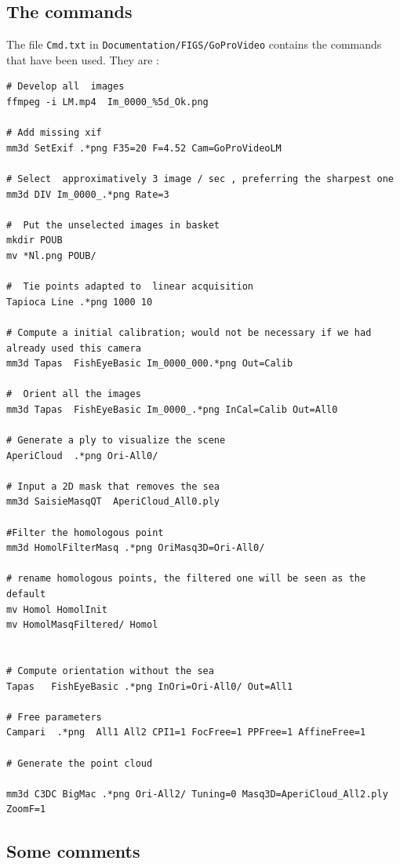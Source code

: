 \subsection{The commands}\label{GoProVideo:Commands}

The file {\tt Cmd.txt} in {\tt Documentation/FIGS/GoProVideo} contains the commands that have been used. They are :

\begin{verbatim}
# Develop all  images
ffmpeg -i LM.mp4  Im_0000_%5d_Ok.png

# Add missing xif
mm3d SetExif .*png F35=20 F=4.52 Cam=GoProVideoLM

# Select  approximatively 3 image / sec , preferring the sharpest one
mm3d DIV Im_0000_.*png Rate=3

#  Put the unselected images in basket
mkdir POUB
mv *Nl.png POUB/

#  Tie points adapted to  linear acquisition
Tapioca Line .*png 1000 10

# Compute a initial calibration; would not be necessary if we had already used this camera
mm3d Tapas  FishEyeBasic Im_0000_000.*png Out=Calib

#  Orient all the images
mm3d Tapas  FishEyeBasic Im_0000_.*png InCal=Calib Out=All0

# Generate a ply to visualize the scene
AperiCloud  .*png Ori-All0/

# Input a 2D mask that removes the sea
mm3d SaisieMasqQT  AperiCloud_All0.ply

#Filter the homologous point
mm3d HomolFilterMasq .*png OriMasq3D=Ori-All0/

# rename homologous points, the filtered one will be seen as the default
mv Homol HomolInit
mv HomolMasqFiltered/ Homol


# Compute orientation without the sea
Tapas   FishEyeBasic .*png InOri=Ori-All0/ Out=All1

# Free parameters
Campari  .*png  All1 All2 CPI1=1 FocFree=1 PPFree=1 AffineFree=1

# Generate the point cloud

mm3d C3DC BigMac .*png Ori-All2/ Tuning=0 Masq3D=AperiCloud_All2.ply ZoomF=1

\end{verbatim}



\subsection{Some comments}\label{GoProVideo:Comments}



